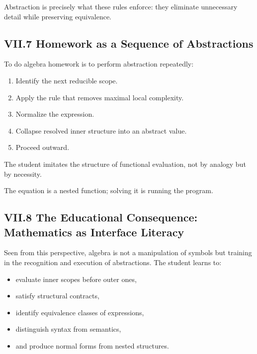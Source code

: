 \documentclass[11pt,letterpaper]{article}
\begin{document}
Abstraction is precisely what these rules enforce: they eliminate unnecessary detail while preserving equivalence.

\subsection{VII.7 Homework as a Sequence of Abstractions}

To do algebra homework is to perform abstraction repeatedly:

\begin{enumerate}
    \item Identify the next reducible scope.
    \item Apply the rule that removes maximal local complexity.
    \item Normalize the expression.
    \item Collapse resolved inner structure into an abstract value.
    \item Proceed outward.
\end{enumerate}

The student imitates the structure of functional evaluation, not by analogy but by necessity.

The equation is a nested function; solving it is running the program.

\subsection{VII.8 The Educational Consequence: Mathematics as Interface Literacy}

Seen from this perspective, algebra is not a manipulation of symbols but training in the recognition and execution of abstractions. The student learns to:

\begin{itemize}
    \item evaluate inner scopes before outer ones,
    \item satisfy structural contracts,
    \item identify equivalence classes of expressions,
    \item distinguish syntax from semantics,
    \item and produce normal forms from nested structures.
\end{itemize}
\end{document}
